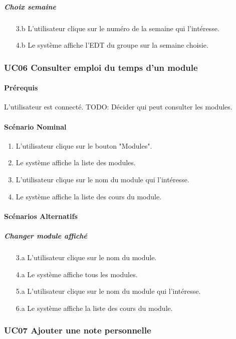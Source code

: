 \documentclass[a4paper,12pt]{article}
\begin{document}
\subparagraph{Choix semaine}
\begin{enumerate}
    \item[3.b] L'utilisateur clique sur le numéro de la semaine qui l'intéresse.
    \item[4.b] Le système affiche l'EDT du groupe sur la semaine choisie.
\end{enumerate}

\subsubsection{UC06 Consulter emploi du temps d'un module}
\paragraph{Prérequis} L'utilisateur est connecté.  
TODO: Décider qui peut consulter les modules.

\paragraph{Scénario Nominal}
\begin{enumerate}
    \item L'utilisateur clique sur le bouton "Modules".
    \item Le système affiche la liste des modules.
    \item L'utilisateur clique sur le nom du module qui l'intéresse.
    \item Le système affiche la liste des cours du module.
\end{enumerate}

\paragraph{Scénarios Alternatifs}
\subparagraph{Changer module affiché}
\begin{enumerate}
    \item[3.a] L'utilisateur clique sur le nom du module.
    \item[4.a] Le système affiche tous les modules.
    \item[5.a] L'utilisateur clique sur le nom du module qui l'intéresse.
    \item[6.a] Le système affiche la liste des cours du module.
\end{enumerate}

\subsubsection{UC07 Ajouter une note personnelle}
\end{document}
